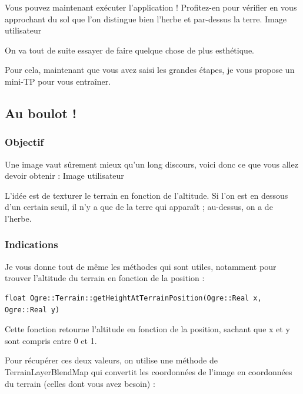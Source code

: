Vous pouvez maintenant ex\'ecuter l'application ! Profitez-en pour v\'erifier en vous approchant du sol que l'on distingue bien l'herbe et par-dessus la terre.
Image utilisateur

On va tout de suite essayer de faire quelque chose de plus esth\'etique.

Pour cela, maintenant que vous avez saisi les grandes \'etapes, je vous propose un mini-TP pour vous entra\^iner.








\subsection{Au boulot !}



\subsubsection{Objectif}

Une image vaut s\^urement mieux qu'un long discours, voici donc ce que vous allez devoir obtenir :
Image utilisateur

L'id\'ee est de texturer le terrain en fonction de l'altitude. Si l'on est en dessous d'un certain seuil, il n'y a que de la terre qui appara\^it ; au-dessus, on a de l'herbe.



\subsubsection{Indications}

Je vous donne tout de m\^eme les m\'ethodes qui sont utiles, notamment pour trouver l'altitude du terrain en fonction de la position :

\begin{lstlisting}[caption={m\'ethode getHeightAtTerrainPosition pour trouver l'altitude du terrain en fonction de la position }]
float Ogre::Terrain::getHeightAtTerrainPosition(Ogre::Real x, Ogre::Real y)
\end{lstlisting}

Cette fonction retourne l'altitude en fonction de la position, sachant que x et y sont compris entre 0 et 1.

Pour r\'ecup\'erer ces deux valeurs, on utilise une m\'ethode de TerrainLayerBlendMap qui convertit les coordonn\'ees de l'image en coordonn\'ees du terrain (celles dont vous avez besoin) :

